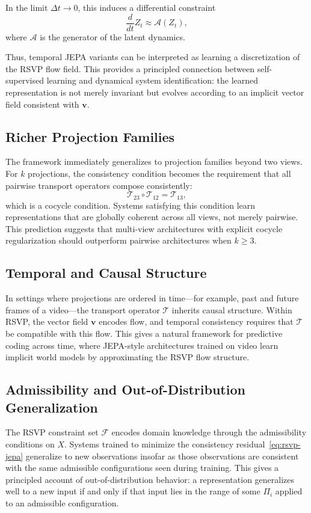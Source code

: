 \documentclass[12pt, oneside]{article}
\begin{document}
In the limit $\Delta t \to 0$, this induces a differential constraint
\[
\frac{d}{dt} Z_t \approx \mathcal{A}(Z_t),
\]
where $\mathcal{A}$ is the generator of the latent dynamics.

Thus, temporal JEPA variants can be interpreted as learning a discretization of the RSVP flow field. This provides a principled connection between self-supervised learning and dynamical system identification: the learned representation is not merely invariant but evolves according to an implicit vector field consistent with $\mathbf{v}$.

\subsection{Richer Projection Families}

The framework immediately generalizes to projection families beyond two views. For $k$ projections, the consistency condition becomes the requirement that all pairwise transport operators compose consistently:
\[
\mathcal{T}_{23} \circ \mathcal{T}_{12} = \mathcal{T}_{13},
\]
which is a cocycle condition. Systems satisfying this condition learn representations that are globally coherent across all views, not merely pairwise. This prediction suggests that multi-view architectures with explicit cocycle regularization should outperform pairwise architectures when $k \geq 3$.

\subsection{Temporal and Causal Structure}

In settings where projections are ordered in time---for example, past and future frames of a video---the transport operator $\mathcal{T}$ inherits causal structure. Within RSVP, the vector field $\mathbf{v}$ encodes flow, and temporal consistency requires that $\mathcal{T}$ be compatible with this flow. This gives a natural framework for predictive coding across time, where JEPA-style architectures trained on video learn implicit world models by approximating the RSVP flow structure.

\subsection{Admissibility and Out-of-Distribution Generalization}

The RSVP constraint set $\mathcal{F}$ encodes domain knowledge through the admissibility conditions on $X$. Systems trained to minimize the consistency residual~\eqref{eq:rsvp-jepa} generalize to new observations insofar as those observations are consistent with the same admissible configurations seen during training. This gives a principled account of out-of-distribution behavior: a representation generalizes well to a new input if and only if that input lies in the range of some $\Pi_i$ applied to an admissible configuration.
\end{document}
